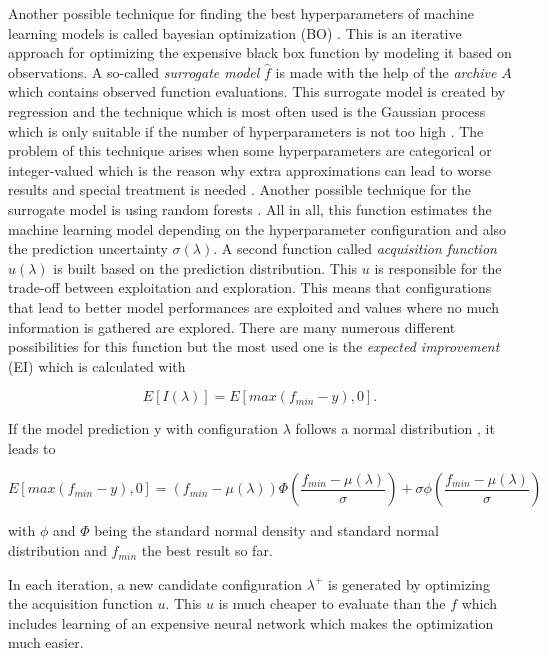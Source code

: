 Another possible technique for finding the best hyperparameters of machine learning models is called bayesian optimization (BO) \cite{snoek2012practical}. This is an iterative approach for optimizing the expensive black box function by modeling it based on observations. A so-called \textit{surrogate model} $ \hat{f} $ is made with the help of the \textit{archive} $ A $ which contains observed function evaluations. This surrogate model is created by regression and the technique which is most often used is the Gaussian process \cite{bischl2021hyperparameter} which is only suitable if the number of hyperparameters is not too high \cite{andonie2019hyperparameter}. The problem of this technique arises when some hyperparameters are categorical or integer-valued which is the reason why extra approximations can lead to worse results and special treatment is needed \cite{garrido2020dealing}. Another possible technique for the surrogate model is using random forests \cite{hutter2011sequential}. All in all, this function estimates the machine learning model depending on the hyperparameter configuration and also the prediction uncertainty $ \sigma(\lambda) $. A second function called \textit{acquisition function} $ u(\lambda)$ is built based on the prediction distribution. This $ u $ is responsible for the trade-off between exploitation and exploration. This means that configurations that lead to better model performances are exploited and values where no much information is gathered are explored. There are many numerous different possibilities for this function  \cite{wilson2018maximizing} but the most used one is the \textit{expected improvement} (EI) which is calculated with

\begin{equation}
	E[I(\lambda)] = E[max(f_{min}-y), 0].
\end{equation}

If the model prediction y with configuration $ \lambda $ follows a normal distribution \cite{feurer2019hyperparameter}, it leads to 

\begin{equation}
	E[max(f_{min}-y), 0] = (f_{min}-\mu(\lambda)) \Phi(\frac{f_{min}-\mu(\lambda)}{\sigma}) + \sigma \phi (\frac{f_{min}-\mu(\lambda)}{\sigma})
\end{equation}

with $ \phi $ and $ \Phi $ being the standard normal density and standard normal distribution and $ f_{min} $ the best result so far. 


In each iteration, a new candidate configuration $ \lambda^+ $  is generated by optimizing the acquisition function $ u $. This $ u $ is much cheaper to evaluate than the $ f $ which includes learning of an expensive neural network which makes the optimization much easier.

